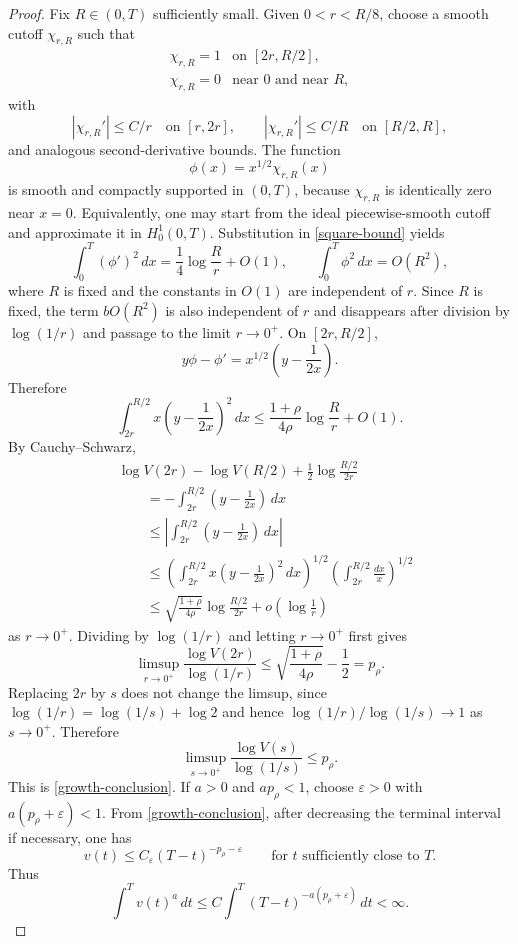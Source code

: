 \documentclass[10pt,a4paper]{amsart}
\numberwithin{equation}{section}
\begin{document}
\begin{proof}
Fix $R\in(0,T)$ sufficiently small.  Given $0<r<R/8$, choose a smooth cutoff $\chi_{r,R}$ such that
$$
\begin{array}{ll}
        \chi_{r,R}=1 &\text{on }[2r,R/2],\\
        \chi_{r,R}=0 &\text{near }0\text{ and near }R,
\end{array}
$$
with
$$
        |\chi_{r,R}'|\leq C/r\quad\text{on }[r,2r],
        \qquad
        |\chi_{r,R}'|\leq C/R\quad\text{on }[R/2,R],
$$
and analogous second-derivative bounds.  The function
$$
        \phi(x)=x^{1/2}\chi_{r,R}(x)
$$
is smooth and compactly supported in $(0,T)$, because $\chi_{r,R}$ is identically zero near $x=0$.  Equivalently, one may start from the ideal piecewise-smooth cutoff and approximate it in $H_0^1(0,T)$.  Substitution in \eqref{square-bound} yields
$$
        \int_0^T(\phi')^2\,dx
        =\frac14\log\frac{R}{r}+O(1),
        \qquad
        \int_0^T\phi^2\,dx=O(R^2),
$$
where $R$ is fixed and the constants in $O(1)$ are independent of $r$.  Since $R$ is fixed, the term $bO(R^2)$ is also independent of $r$ and disappears after division by $\log(1/r)$ and passage to the limit $r\to0^+$.  On $[2r,R/2]$,
$$
        y\phi-\phi'=x^{1/2}\left(y-\frac1{2x}\right).
$$
Therefore
\begin{equation}\label{central-bound}
        \int_{2r}^{R/2} x\left(y-\frac1{2x}\right)^2\,dx
        \leq
        \frac{1+\rho}{4\rho}\log\frac{R}{r}+O(1).
\end{equation}
By Cauchy--Schwarz,
\begin{align*}
&\log V(2r)-\log V(R/2)+\frac12\log\frac{R/2}{2r} \\
&\qquad
= -\int_{2r}^{R/2}\left(y-\frac1{2x}\right)\,dx \\
&\qquad
\leq
\left|\int_{2r}^{R/2}\left(y-\frac1{2x}\right)\,dx\right| \\
&\qquad
\leq
\left(\int_{2r}^{R/2}x\left(y-\frac1{2x}\right)^2\,dx\right)^{1/2}
\left(\int_{2r}^{R/2}\frac{dx}{x}\right)^{1/2} \\
&\qquad
\leq
\sqrt{\frac{1+\rho}{4\rho}}\log\frac{R/2}{2r}+o\!\left(\log\frac1r\right)
\end{align*}
as $r\to0^+$.  Dividing by $\log(1/r)$ and letting $r\to0^+$ first gives
$$
        \limsup_{r\to0^+}\frac{\log V(2r)}{\log(1/r)}
        \leq
        \sqrt{\frac{1+\rho}{4\rho}}-\frac12
        =p_\rho .
$$
Replacing $2r$ by $s$ does not change the limsup, since
$\log(1/r)=\log(1/s)+\log 2$ and hence
$\log(1/r)/\log(1/s)\to1$ as $s\to0^+$.  Therefore
$$
        \limsup_{s\to0^+}\frac{\log V(s)}{\log(1/s)}
        \leq p_\rho .
$$
This is \eqref{growth-conclusion}.  If $a>0$ and $a p_\rho<1$, choose $\varepsilon>0$ with $a(p_\rho+\varepsilon)<1$.  From \eqref{growth-conclusion}, after decreasing the terminal interval if necessary, one has
$$
        v(t)\leq C_\varepsilon (T-t)^{-p_\rho-\varepsilon}
        \qquad\text{for }t\text{ sufficiently close to }T.
$$
Thus
$$
        \int^T v(t)^a\,dt
        \leq
        C\int^T (T-t)^{-a(p_\rho+\varepsilon)}\,dt<\infty .
$$
\end{proof}
\end{document}
